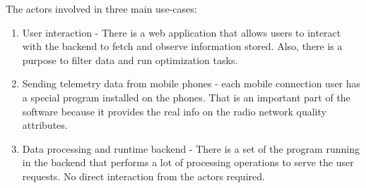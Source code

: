 The actors involved in three main use-cases:

\begin{enumerate}
\def\labelenumi{\arabic{enumi}.}

\item
  User interaction - There is a web application that allows users to
  interact with the backend to fetch and observe information stored.
  Also, there is a purpose to filter data and run optimization tasks.
\item
  Sending telemetry data from mobile phones - each mobile connection
  user has a special program installed on the phones. That is an
  important part of the software because it provides the real info on
  the radio network quality attributes.
\item
  Data processing and runtime backend - There is a set of the program
  running in the backend that performs a lot of processing operations to
  serve the user requests. No direct interaction from the actors
  required.
\end{enumerate}

